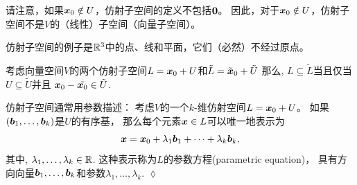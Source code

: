 请注意，如果$\boldsymbol{x}_0 \notin U$，仿射子空间的定义不包括$\boldsymbol{0}$。
因此，对于$\boldsymbol{x}_0 \notin U$，仿射子空间不是$V$的（线性）子空间（向量子空间）。

仿射子空间的例子是$\mathbb{R}^3$中的点、线和平面，它们（必然）不经过原点。
\begin{remark}
    考虑向量空间$V$的两个仿射子空间$L = \boldsymbol{x}_0 + U$和$\tilde{L} = \tilde{\boldsymbol{x}}_0 + \tilde{U}$
    那么, $L \subseteq \tilde{L}$当且仅当$U \subseteq \tilde{U}$并且
    $\boldsymbol{x}_0 - \tilde{\boldsymbol{x}_0} \in \tilde{U}$.
\end{remark}

仿射子空间通常用参数描述：
考虑$V$的一个$k$-维仿射空间$L = \boldsymbol{x}_0 + U$。
如果$(\boldsymbol{b}_1,\dots,\boldsymbol{b}_k)$是$U$的有序基，
那么每个元素$\boldsymbol{x} \in L$可以唯一地表示为
\begin{equation}
    \boldsymbol{x} = \boldsymbol{x}_0 + \lambda_1\boldsymbol{b}_1 + \dots + \lambda_k\boldsymbol{b}_k,
\end{equation}
其中, $\lambda_1,\dots, \lambda_k \in \mathbb{R}$.
这种表示称为$L$的参数方程(parametric equation)，
具有方向向量$\boldsymbol{b}_1,\dots, \boldsymbol{b}_k$和参数$\lambda_1, \dots,\lambda_k$.
\hfill $\lozenge$

